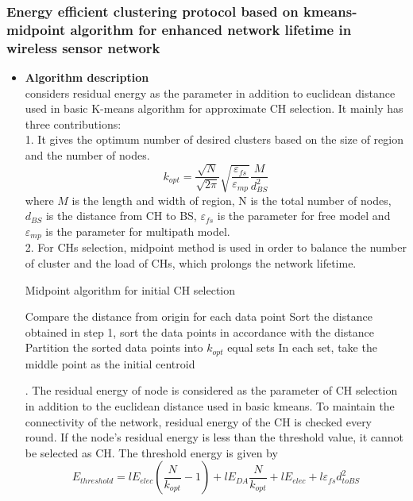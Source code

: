 \documentclass[11pt]{report}
\begin{document}
    \subsubsection{Energy efficient clustering protocol based on kmeans-midpoint algorithm for enhanced network lifetime in wireless sensor network}
    \begin{itemize}
    	\item \textbf{Algorithm description}\\
    	\noindent \cite{7763028} considers residual energy as the parameter in addition to euclidean distance used in basic K-means algorithm for approximate CH selection. It mainly has three contributions:\\
    	1. It gives the optimum number of desired clusters based on the size of region and the number of nodes.
    	\begin{equation}
    	k_{opt} = \frac{\sqrt{N}}{\sqrt{2 \pi}} \sqrt{\frac{\varepsilon_{fs}}{\varepsilon_{mp}}} \frac{M}{d^2_{BS}}
    	\end{equation}
    	where $M$ is the length and width of region, N is the total number of nodes, $d_{BS}$ is the distance from CH to BS, $\varepsilon_{fs}$ is the parameter for free model and $\varepsilon_{mp}$ is the parameter for multipath model. \\
    	2. For CHs selection, midpoint method is used in order to balance the number of cluster and the load of CHs, which prolongs the network lifetime. \\
    	
    	\begin{algorithm}[H]
    		\caption{Midpoint algorithm for initial CH selection}
    		\LinesNumbered
    		\begin{algorithmic}[1]
    			\STATE Compare the distance from origin for each data point
    			\STATE Sort the distance obtained in step 1, sort the data points in accordance with the distance
    			\STATE Partition the sorted data points into $k_{opt}$ equal sets
    			\STATE In each set, take the middle point as the initial centroid
    		\end{algorithmic}
    	\end{algorithm}
    	. The residual energy of node is considered as the parameter of CH selection in addition to the euclidean distance used in basic kmeans. To maintain the connectivity of the network, residual energy of the CH is checked every round. If the node's residual energy is less than the threshold value, it cannot be selected as CH. The threshold energy is given by
    	\begin{equation}
    	E_{threshold} = lE_{elec}\left(\frac{N}{k_{opt}}-1\right) + lE_{DA}\frac{N}{k_{opt}} + lE_{elec} + l\varepsilon_{fs}d^2_{toBS}
    	\end{equation}
    	

\end{itemize}
\end{document}
